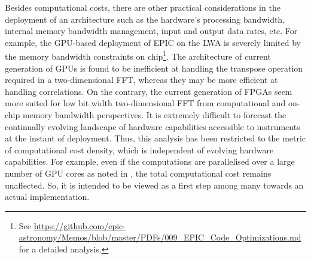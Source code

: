 \documentclass[
  journal=pasa,
  manuscript=article-type,
  year=2020,
  volume=37,
]{cup-journal}
\begin{document}
Besides computational costs, there are other practical considerations in the deployment of an architecture such as the hardware's processing bandwidth, internal memory bandwidth management, input and output data rates, etc. For example, the GPU-based deployment of EPIC on the LWA is severely limited by the memory bandwidth constraints on chip\footnote{See \url{https://github.com/epic-astronomy/Memos/blob/master/PDFs/009_EPIC_Code_Optimizations.md} for a detailed analysis.}. The architecture of current generation of GPUs is found to be inefficient at handling the transpose operation required in a two-dimensional FFT, whereas they may be more efficient at handling correlations. On the contrary, the current generation of FPGAs seem more suited for low bit width two-dimensional FFT from computational and on-chip memory bandwidth perspectives. It is extremely difficult to forecast the continually evolving landscape of hardware capabilities accessible to instruments at the instant of deployment. Thus, this analysis has been restricted to the metric of computational cost density, which is independent of evolving hardware capabilities. For example, even if the computations are parallelised over a large number of GPU cores as noted in \citet{Sokolowski+2024}, the total computational cost remains unaffected. So, it is intended to be viewed as a first step among many towards an actual implementation. 






\end{document}
